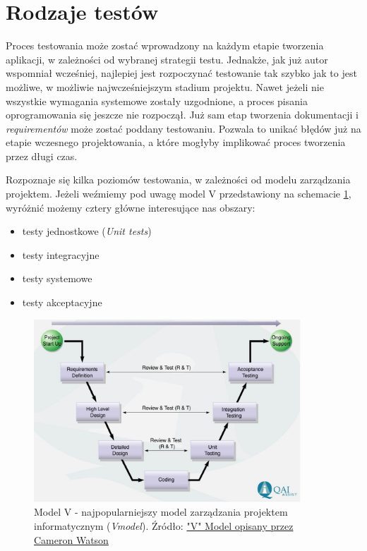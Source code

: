\section{Rodzaje testów}
Proces testowania może zostać wprowadzony na każdym etapie tworzenia aplikacji, w zależności od wybranej strategii testu. Jednakże, jak już autor wspomniał wcześniej, najlepiej jest rozpoczynać testowanie tak szybko jak to jest możliwe, w możliwie najwcześniejszym stadium projektu. Nawet jeżeli nie wszystkie wymagania systemowe zostały uzgodnione, a proces pisania oprogramowania się jeszcze nie rozpoczął. Już sam etap tworzenia dokumentacji i \textit{requirementów} może zostać poddany testowaniu. Pozwala to unikać błędów już na etapie wczesnego projektowania, a które mogłyby implikować proces tworzenia przez długi czas.

Rozpoznaje się kilka poziomów testowania, w zależności od modelu zarządzania projektem. Jeżeli weźmiemy pod uwagę model V przedstawiony na schemacie \ref{fig:model_v}, wyróżnić możemy cztery główne interesujące nas obszary:

\begin{itemize}
\item
testy jednostkowe (\textit{Unit tests})
\item
testy integracyjne
\item
testy systemowe
\item
testy akceptacyjne

\end{itemize}

\begin{figure}[!htb]
    \centering
    \includegraphics[width=10cm]{imgs/ch2_model_v.jpg}
    \caption{Model V - najpopularniejszy model zarządzania projektem informatycznym (\textit{V\-model}). Źródło: \href{http://www.projectinsight.net/blogs/it-project-management-solutions/the-quot-v-quot-model-by-cameron-watson}{"V" Model opisany przez Cameron Watson}}
    \label{fig:model_v}
\end{figure} 


